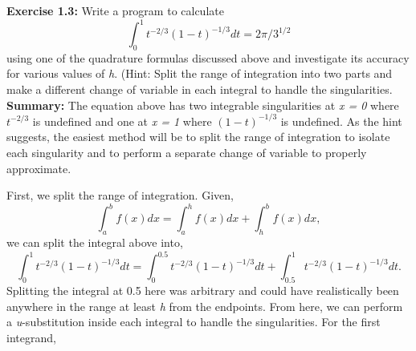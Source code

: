 \documentclass[10pt]{article}
\begin{document}
\newpage\noindent
\label{exercise:1.3}\textbf{Exercise 1.3:} Write a program to calculate
\[
\int^1_0 t^{-2/3}(1-t)^{-1/3}dt=2\pi /3^{1/2}
\]
using one of the quadrature formulas discussed above and investigate its accuracy for various values of \textit{h}. (Hint: Split the range of integration into two parts and make a different change of variable in each integral to handle the singularities.\\

\noindent\textbf{Summary:} The equation above has two integrable singularities at \textit{x = 0} where $t^{-2/3}$ is undefined and one at \textit{x = 1} where $(1-t)^{-1/3}$ is undefined. As the hint suggests, the easiest method will be to split the range of integration to isolate each singularity and to perform a separate change of variable to properly approximate.

First, we split the range of integration. Given,
\[
\int^b_a f(x)dx = \int^h_a f(x)dx + \int^b_h f(x)dx,
\]
we can split the integral above into,
\begin{equation}
\int^1_0 t^{-2/3}(1-t)^{-1/3}dt=\int_0^{0.5}t^{-2/3}(1-t)^{-1/3}dt+\int_{0.5}^1t^{-2/3}(1-t)^{-1/3}dt.
\end{equation}
Splitting the integral at 0.5 here was arbitrary and could have realistically been anywhere in the range at least \textit{h} from the endpoints.
From here, we can perform a \textit{u}-substitution inside each integral to handle the singularities. For the first integrand, 
\end{document}
